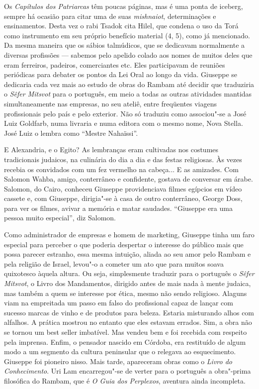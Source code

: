 Os \emph{Capítulos dos Patriarcas} têm poucas páginas, mas é uma ponta
de iceberg, sempre há ocasião para citar uma de suas \emph{mishnaiot},
determinações e ensinamentos. Desta vez o rabi Tsadok cita Hilel, que
condena o uso da Torá como instrumento em seu próprio benefício material
(4, 5), como já mencionado. Da mesma maneira que os sábios talmúdicos,
que se dedicavam normalmente a diversas profissões --- sabemos pelo
apelido colado aos nomes de muitos deles que eram ferreiros, padeiros,
comerciantes etc. Eles participavam de reuniões periódicas para debater
os pontos da Lei Oral ao longo da vida. Giuseppe se dedicaria cada vez
mais ao estudo de obras do Rambam até decidir que traduziria o
\emph{Sêfer Mitsvot} para o português, em meio a todas as outras
atividades mantidas simultaneamente nas empresas, no seu ateliê, entre
freqüentes viagens profissionais pelo país e pelo exterior. Não só
traduziu como associou"-se a José Luiz Goldfarb, numa livraria e numa
editora com o mesmo nome, Nova Stella. José Luiz o lembra como ``Mestre
Nahaïssi''.

E Alexandria, e o Egito? As lembranças eram cultivadas nos costumes
tradicionais judaicos, na culinária do dia a dia e das festas
religiosas. Às vezes recebia os convidados com um fez vermelho na
cabeça... E as amizades. Com Salomon Wahba, amigo, conterrâneo e
confidente, gostava de conversar em árabe. Salomon, do Cairo, conheceu
Giuseppe providenciava filmes egípcios em vídeo cassete e, com Giuseppe,
dirigia"-se à casa de outro conterrâneo, George Doss, para ver os filmes,
avivar a memória e matar saudades. ``Giuseppe era uma pessoa muito
especial'', diz Salomon.

\asterisc

Como administrador de empresas e homem de marketing, Giuseppe tinha um
faro especial para perceber o que poderia despertar o interesse do
público mais que possa parecer estranho, essa mesma intuição, aliada ao
seu amor pelo Rambam e pela religião de Israel, levou"-o a cometer um ato
que para muitos soava quixotesco àquela altura. Ou seja, simplesmente
traduzir para o português o \emph{Sêfer Mitsvot}, o Livro dos
Mandamentos, dirigido antes de mais nada à mente judaica, mas também a
quem se interesse por ética, mesmo não sendo religioso. Alaguns viam na
empreitada um passo em falso do profissional capaz de lançar com sucesso
marcas de vinho e de produtos para beleza. Estaria misturando alhos com
alfalhos. A prática mostrou no entanto que eles estavam errados. Sim, a
obra não se tornou um best seller imbatível. Mas vendeu bem e foi
recebida com respeito pela imprensa. Enfim, o pensador nascido em
Córdoba, era restituído de algum modo a um segmento da cultura
peninsular que o relegava ao esquecimento. Giuseppe foi pioneiro nisso.
Mais tarde, apareceram obras como o \emph{Livro do Conhecimento}. Uri
Lam encarregou"-se de verter para o português a obra"-prima filosófica do
Rambam, que é \emph{O Guia dos Perplexos}, aventura ainda incompleta.

